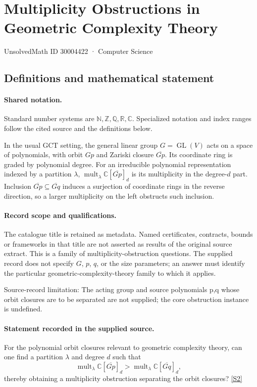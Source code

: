 \documentclass[11pt]{article}
\newcommand{\sref}[2]{\hyperlink{source:#1:#2}{[S#2]}}
\begin{document}
\setcounter{section}{30004421}
\section{Multiplicity Obstructions in Geometric Complexity Theory}\label{30004422}
{\small\sffamily UnsolvedMath ID 30004422 · Computer Science}
\subsection{Definitions and mathematical statement}

\paragraph{Shared notation.}Standard number systems are $\mathbb N,\mathbb Z,\mathbb Q,\mathbb R,\mathbb C$. Specialized notation and index ranges follow the cited source and the definitions below.


In the usual GCT setting, the general linear group $G=\operatorname{GL}(V)$ acts on a space of polynomials, with orbit $Gp$ and Zariski closure $\overline{Gp}$. Its coordinate ring is graded by polynomial degree. For an irreducible polynomial representation indexed by a partition $\lambda$, $\operatorname{mult}_\lambda\mathbb C[\overline{Gp}]_d$ is its multiplicity in the degree-$d$ part. Inclusion $\overline{Gp}\subseteq\overline{Gq}$ induces a surjection of coordinate rings in the reverse direction, so a larger multiplicity on the left obstructs such inclusion.
\paragraph{Record scope and qualifications.}
The catalogue title is retained as metadata. Named certificates, contracts, bounds or frameworks in that title are not asserted as results of the original source extract.
This is a family of multiplicity-obstruction questions. The supplied record does not specify $G$, $p$, $q$, or the size parameters; an answer must identify the particular geometric-complexity-theory family to which it applies.

Source-record limitation: The acting group and source polynomials p,q whose orbit closures are to be separated are not supplied; the core obstruction instance is undefined.
\paragraph{Statement recorded in the supplied source.}
For the polynomial orbit closures relevant to geometric complexity theory, can one find a partition $\lambda$ and degree $d$ such that
$$
\operatorname{mult}_\lambda\mathbb C[\overline{Gp}]_d>\operatorname{mult}_\lambda\mathbb C[\overline{Gq}]_d,
$$
thereby obtaining a multiplicity obstruction separating the orbit closures? \sref{30004422}{2}
\end{document}
